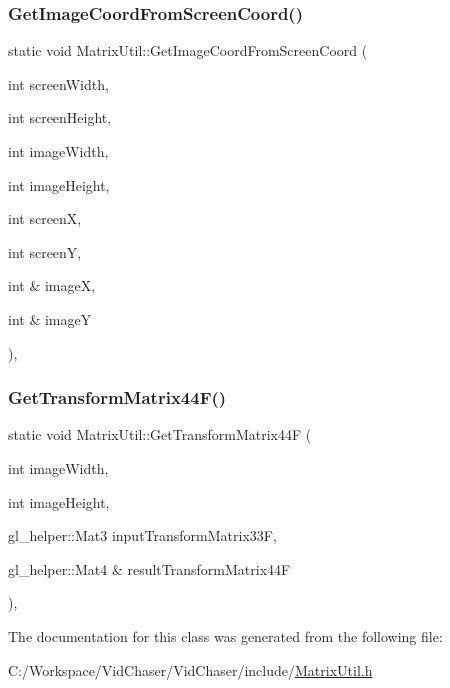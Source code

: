 \mbox{\label{class_matrix_util_a8f1decb02c479ea6831e7baa7cf77a38}} 
\subsubsection{\texorpdfstring{Get\+Image\+Coord\+From\+Screen\+Coord()}{GetImageCoordFromScreenCoord()}}
{\footnotesize\ttfamily static void Matrix\+Util\+::\+Get\+Image\+Coord\+From\+Screen\+Coord (\begin{DoxyParamCaption}\item[{int}]{screen\+Width,  }\item[{int}]{screen\+Height,  }\item[{int}]{image\+Width,  }\item[{int}]{image\+Height,  }\item[{int}]{screenX,  }\item[{int}]{screenY,  }\item[{int \&}]{imageX,  }\item[{int \&}]{imageY }\end{DoxyParamCaption})\hspace{0.3cm}{\ttfamily [inline]}, {\ttfamily [static]}}

\mbox{\label{class_matrix_util_a6a1d9aa13dc395bd7a8940ea6784b34e}} 
\subsubsection{\texorpdfstring{Get\+Transform\+Matrix44\+F()}{GetTransformMatrix44F()}}
{\footnotesize\ttfamily static void Matrix\+Util\+::\+Get\+Transform\+Matrix44F (\begin{DoxyParamCaption}\item[{int}]{image\+Width,  }\item[{int}]{image\+Height,  }\item[{gl\+\_\+helper\+::\+Mat3}]{input\+Transform\+Matrix33F,  }\item[{gl\+\_\+helper\+::\+Mat4 \&}]{result\+Transform\+Matrix44F }\end{DoxyParamCaption})\hspace{0.3cm}{\ttfamily [inline]}, {\ttfamily [static]}}



The documentation for this class was generated from the following file\+:\begin{DoxyCompactItemize}
\item 
C\+:/\+Workspace/\+Vid\+Chaser/\+Vid\+Chaser/include/\hyperlink{_matrix_util_8h}{Matrix\+Util.\+h}\end{DoxyCompactItemize}
